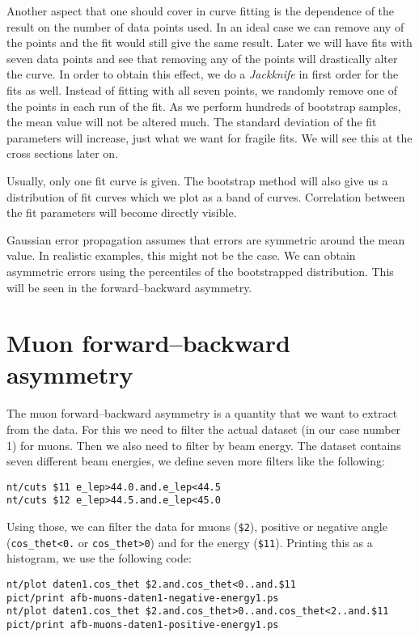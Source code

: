 \documentclass[11pt, english, fleqn, DIV=15, headinclude, BCOR=2cm]{scrreprt}
\begin{document}
Another aspect that one should cover in curve fitting is the dependence of the
result on the number of data points used. In an ideal case we can remove any of
the points and the fit would still give the same result. Later we will have
fits with seven data points and see that removing any of the points will
drastically alter the curve. In order to obtain this effect, we do a
\emph{Jackknife} in first order for the fits as well. Instead of fitting with
all seven points, we randomly remove one of the points in each run of the fit.
As we perform hundreds of bootstrap samples, the mean value will not be altered
much. The standard deviation of the fit parameters will increase, just what we
want for fragile fits. We will see this at the cross sections later on.

Usually, only one fit curve is given. The bootstrap method will also give us a
distribution of fit curves which we plot as a band of curves. Correlation
between the fit parameters will become directly visible.

Gaussian error propagation assumes that errors are symmetric around the mean
value. In realistic examples, this might not be the case. We can obtain
asymmetric errors using the percentiles of the bootstrapped distribution. This
will be seen in the forward--backward asymmetry.

\section{Muon forward--backward asymmetry}

The muon forward--backward asymmetry is a quantity that we want to extract from
the data. For this we need to filter the actual dataset (in our case number 1)
for muons. Then we also need to filter by beam energy. The dataset contains
seven different beam energies, we define seven more filters like the following:

\begin{lstlisting}
nt/cuts $11 e_lep>44.0.and.e_lep<44.5
nt/cuts $12 e_lep>44.5.and.e_lep<45.0
\end{lstlisting}

Using those, we can filter the data for muons (\texttt{\$2}), positive or
negative angle (\texttt{cos\_thet<0.} or \texttt{cos\_thet>0}) and for the energy (\texttt{\$11}). Printing this as
a histogram, we use the following code:

\begin{lstlisting}
nt/plot daten1.cos_thet $2.and.cos_thet<0..and.$11
pict/print afb-muons-daten1-negative-energy1.ps
nt/plot daten1.cos_thet $2.and.cos_thet>0..and.cos_thet<2..and.$11
pict/print afb-muons-daten1-positive-energy1.ps
\end{lstlisting}
\end{document}
